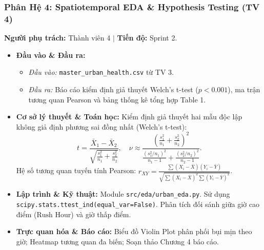 \documentclass[11pt,a4paper]{article}
\begin{document}
\subsubsection{Phân Hệ 4: Spatiotemporal EDA \& Hypothesis Testing (TV 4)}
\textbf{Người phụ trách:} Thành viên 4 \quad $\vert$ \quad \textbf{Tiến độ:} Sprint 2.
\begin{itemize}[leftmargin=*]
    \item \textbf{Đầu vào \& Đầu ra:}
    \begin{itemize}
        \item \textit{Đầu vào:} \texttt{master\_urban\_health.csv} từ TV 3.
        \item \textit{Đầu ra:} Báo cáo kiểm định giả thuyết Welch's t-test ($p < 0.001$), ma trận tương quan Pearson và bảng thống kê tổng hợp Table 1.
    \end{itemize}
    \item \textbf{Cơ sở lý thuyết \& Toán học:}
    Kiểm định giả thuyết hai mẫu độc lập không giả định phương sai đồng nhất (Welch's t-test):
    \begin{equation}
        t = \frac{\bar{X}_1 - \bar{X}_2}{\sqrt{\frac{s_1^2}{n_1} + \frac{s_2^2}{n_2}}}, \quad \nu \approx \frac{\left(\frac{s_1^2}{n_1} + \frac{s_2^2}{n_2}\right)^2}{\frac{(s_1^2/n_1)^2}{n_1-1} + \frac{(s_2^2/n_2)^2}{n_2-1}}.
    \end{equation}
    Hệ số tương quan tuyến tính Pearson: $r_{XY} = \frac{\sum (X_i - \bar{X})(Y_i - \bar{Y})}{\sqrt{\sum (X_i - \bar{X})^2 \sum (Y_i - \bar{Y})^2}}$.
    \item \textbf{Lập trình \& Kỹ thuật:} Module \texttt{src/eda/urban\_eda.py}. Sử dụng \texttt{scipy.stats.ttest\_ind(equal\_var=False)}. Phân tích đối sánh giữa giờ cao điểm ($\text{Rush Hour}$) và giờ thấp điểm.
    \item \textbf{Trực quan hóa \& Báo cáo:} Biểu đồ Violin Plot phân phối bụi mịn theo giờ; Heatmap tương quan đa biến; Soạn thảo Chương 4 báo cáo.
\end{itemize}
\end{document}
